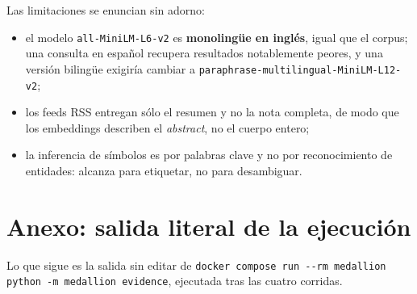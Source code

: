\documentclass[11pt,a4paper]{article}
\begin{document}
Las limitaciones se enuncian sin adorno:

\begin{itemize}\setlength\itemsep{0.1em}
  \item el modelo \texttt{all-MiniLM-L6-v2} es \textbf{monolingüe en inglés},
        igual que el corpus; una consulta en español recupera resultados
        notablemente peores, y una versión bilingüe exigiría cambiar a
        \texttt{paraphrase-multilingual-MiniLM-L12-v2};
  \item los feeds RSS entregan sólo el resumen y no la nota completa, de modo
        que los embeddings describen el \emph{abstract}, no el cuerpo entero;
  \item la inferencia de símbolos es por palabras clave y no por reconocimiento
        de entidades: alcanza para etiquetar, no para desambiguar.
\end{itemize}

\appendix
\section{Anexo: salida literal de la ejecución}

Lo que sigue es la salida sin editar de
\texttt{docker compose run -{}-rm medallion python -m medallion evidence},
ejecutada tras las cuatro corridas.

{\footnotesize
{}
}
\end{document}
